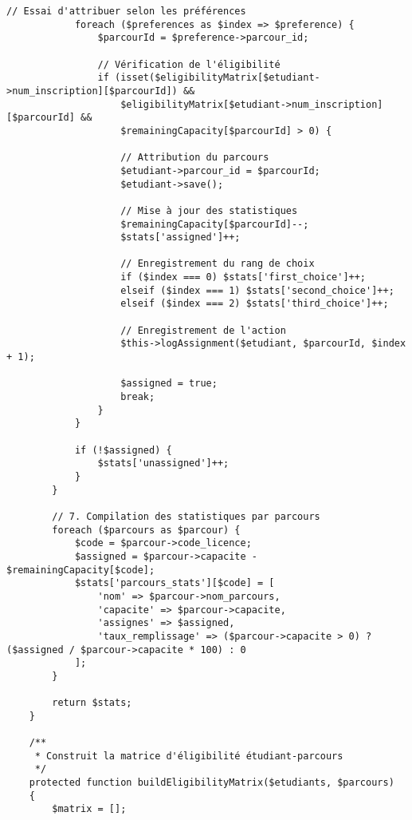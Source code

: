 \documentclass[french,12pt]{report} %
\begin{document}
\begin{lstlisting}[style=phpstyle,caption={AssignmentService - Algorithme d'attribution des parcours}]
            // Essai d'attribuer selon les préférences
            foreach ($preferences as $index => $preference) {
                $parcourId = $preference->parcour_id;
                
                // Vérification de l'éligibilité
                if (isset($eligibilityMatrix[$etudiant->num_inscription][$parcourId]) && 
                    $eligibilityMatrix[$etudiant->num_inscription][$parcourId] &&
                    $remainingCapacity[$parcourId] > 0) {
                    
                    // Attribution du parcours
                    $etudiant->parcour_id = $parcourId;
                    $etudiant->save();
                    
                    // Mise à jour des statistiques
                    $remainingCapacity[$parcourId]--;
                    $stats['assigned']++;
                    
                    // Enregistrement du rang de choix
                    if ($index === 0) $stats['first_choice']++;
                    elseif ($index === 1) $stats['second_choice']++;
                    elseif ($index === 2) $stats['third_choice']++;
                    
                    // Enregistrement de l'action
                    $this->logAssignment($etudiant, $parcourId, $index + 1);
                    
                    $assigned = true;
                    break;
                }
            }
            
            if (!$assigned) {
                $stats['unassigned']++;
            }
        }
        
        // 7. Compilation des statistiques par parcours
        foreach ($parcours as $parcour) {
            $code = $parcour->code_licence;
            $assigned = $parcour->capacite - $remainingCapacity[$code];
            $stats['parcours_stats'][$code] = [
                'nom' => $parcour->nom_parcours,
                'capacite' => $parcour->capacite,
                'assignes' => $assigned,
                'taux_remplissage' => ($parcour->capacite > 0) ? ($assigned / $parcour->capacite * 100) : 0
            ];
        }
        
        return $stats;
    }
    
    /**
     * Construit la matrice d'éligibilité étudiant-parcours
     */
    protected function buildEligibilityMatrix($etudiants, $parcours)
    {
        $matrix = [];
        

\end{lstlisting}
\end{document}
